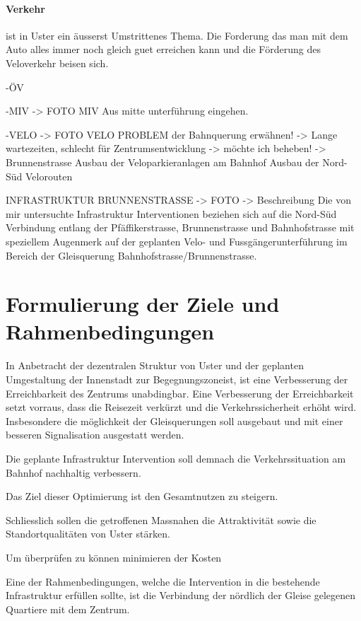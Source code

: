 \paragraph{Verkehr} ist in Uster ein äusserst Umstrittenes Thema. Die Forderung das man mit dem Auto alles immer noch gleich guet erreichen kann und die Förderung des Veloverkehr beisen sich. 

 -ÖV
 
 -MIV
 	-> FOTO MIV
 	Aus mitte unterführung eingehen.
 	
 -VELO
 	-> FOTO VELO
	PROBLEM der Bahnquerung erwähnen! -> Lange wartezeiten, schlecht für Zentrumsentwicklung -> möchte ich beheben! -> Brunnenstrasse
	Ausbau der Veloparkieranlagen am Bahnhof
	 Ausbau der Nord-Süd Velorouten 

INFRASTRUKTUR BRUNNENSTRASSE
-> FOTO 
-> Beschreibung
Die von mir untersuchte Infrastruktur Interventionen beziehen sich auf die Nord-Süd Verbindung
entlang der Pfäffikerstrasse, Brunnenstrasse und Bahnhofstrasse mit speziellem Augenmerk auf der geplanten Velo- und Fussgängerunterführung im Bereich der Gleisquerung Bahnhofstrasse/Brunnenstrasse. 



\pagebreak

\section{Formulierung der Ziele und Rahmenbedingungen}
\label{sec:Zielformulierung}

In Anbetracht der dezentralen Struktur von Uster und der geplanten Umgestaltung der Innenstadt zur Begegnungszoneist, ist eine Verbesserung der Erreichbarkeit des Zentrums unabdingbar. Eine Verbesserung der Erreichbarkeit setzt vorraus, dass die Reisezeit verkürzt und die Verkehrssicherheit erhöht wird. Insbesondere die möglichkeit der Gleisquerungen soll ausgebaut und mit einer besseren Signalisation ausgestatt werden. 


Die geplante Infrastruktur Intervention soll demnach die Verkehrssituation am Bahnhof nachhaltig verbessern.

Das Ziel dieser Optimierung ist den Gesamtnutzen zu steigern.
 

Schliesslich sollen die getroffenen Massnahen die Attraktivität sowie die Standortqualitäten von Uster stärken.

Um überprüfen zu können minimieren der Kosten
 
Eine der Rahmenbedingungen, welche die Intervention in die bestehende Infrastruktur erfüllen sollte, ist die Verbindung der nördlich der Gleise gelegenen Quartiere mit dem Zentrum. 


